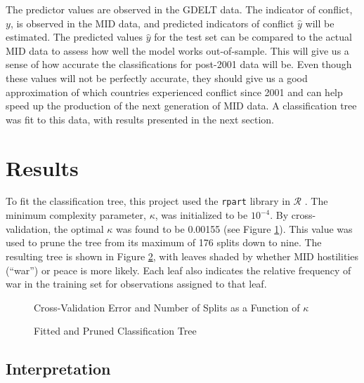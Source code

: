 \documentclass[12pt,letterpaper]{article}
\begin{document}
The predictor values are observed in the GDELT data. The indicator of conflict, $y$, is observed in the MID data, and predicted indicators of conflict $\hat{y}$ will be estimated. The predicted values $\hat{y}$ for the test set can be compared to the actual MID data to assess how well the model works out-of-sample. This will give us a sense of how accurate the classifications for post-2001 data will be. Even though these values will not be perfectly accurate, they should give us a good approximation of which countries experienced conflict since 2001 and can help speed up the production of the next generation of MID data. A classification tree was fit to this data, with results presented in the next section.


\section{Results}
\label{results}

To fit the classification tree, this project used the \texttt{rpart} library in $\mathcal{R}$ \citep{therneau1997introduction}. The minimum complexity parameter, $\kappa$, was initialized to be $10^{-4}$. By cross-validation, the optimal $\kappa$ was found to be 0.00155 (see Figure \ref{cpplot}). This value was used to prune the tree from its maximum of 176 splits down to nine. The resulting tree is shown in Figure \ref{tree}, with leaves shaded by whether MID hostilities (``war'') or peace is more likely. Each leaf also indicates the relative frequency of war in the training set for observations assigned to that leaf.

\begin{figure}
  \begin{center}
    
    \caption{Cross-Validation Error and Number of Splits as a Function of $\kappa$}
    \label{cpplot}
  \end{center}
\end{figure}

\begin{figure}
  \begin{center}
    
    \caption{Fitted and Pruned Classification Tree}
    \label{tree}
  \end{center}
\end{figure}

\subsection{Interpretation}
\end{document}
